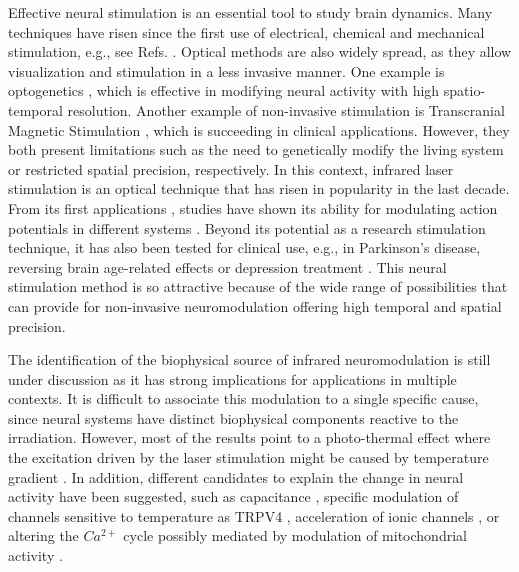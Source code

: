 
Effective neural stimulation is an essential tool to study brain dynamics. Many techniques have risen since the first use of electrical, chemical and mechanical stimulation, e.g., see Refs. \parencite{cogan_neural_2008, chamorro_generalization_2012, carter_guide_2015, bickle_revolutions_2016}. Optical methods are also widely spread, as they allow visualization \parencite{lecoq_wide_2019} and stimulation in a less invasive manner. One example is optogenetics \parencite{boyden_millisecondtimescale_2005, yizhar_optogenetics_2011, tye_optogenetic_2012,bansal_translational_2022}, which is effective in modifying neural activity with high spatio-temporal resolution. Another example of non-invasive stimulation is Transcranial Magnetic Stimulation \parencite{valero-cabre_transcranial_2017}, which is succeeding in clinical applications. However, they both present limitations such as the need to genetically modify the living system or restricted spatial precision, respectively. In this context, infrared laser stimulation is an optical technique that has risen in popularity in the last decade. From its first applications \parencite{wells_application_2005, izzo_optical_2007}, studies have shown its ability for modulating action potentials in different systems \parencite{liang_temperaturedependent_2009, goyal_acute_2012, brown_thermal_2020, barrett_pulsed_2018, shapiro_infrared_2012, cayce_infrared_2014, begeng_activity_2022}. Beyond its potential as a research stimulation technique, it has also been tested for clinical use, e.g., in Parkinson's disease, reversing brain age-related effects or depression treatment \parencite{konstantinovic_transcranial_2013, disner_transcranial_2016, wang_impact_2017, saucedo_transcranial_2021, pan_infrared_2023}. This neural stimulation method is so attractive because of the wide range of possibilities that can provide for non-invasive neuromodulation offering high temporal and spatial precision.

The identification of the biophysical source of infrared neuromodulation is still under discussion as it has strong implications for applications in multiple contexts. It is difficult to associate this modulation to a single specific cause, since neural systems have distinct biophysical components reactive to the irradiation. However, most of the results point to a photo-thermal effect where the excitation driven by the laser stimulation might be caused by temperature gradient \parencite{wells_biophysical_2007}. In addition, different candidates to explain the change in neural activity have been suggested, such as capacitance \parencite{shapiro_infrared_2012, plaksin_thermal_2018}, specific modulation of channels sensitive to temperature as TRPV4 \parencite{albert_trpv4_2012}, acceleration of ionic channels \parencite{liang_temperaturedependent_2009}, or altering the $Ca^{2+}$ cycle possibly mediated by modulation of mitochondrial activity \parencite{dittami_intracellular_2011, lumbreras_pulsed_2014, saucedo_transcranial_2021}.

